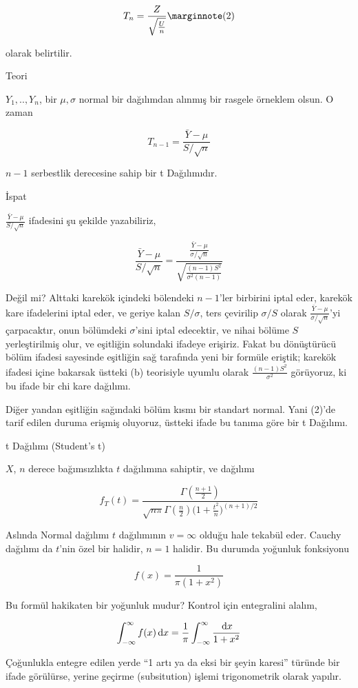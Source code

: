 \documentclass[12pt,fleqn]{article}\usepackage{../../common}
\begin{document}
$$ 
T_n = \frac{Z}{\sqrt{ \frac{U}{n}}} 
\mlabel{2} 
$$

olarak belirtilir.

Teori

$Y_1,..,Y_n$, bir $\mu,\sigma$ normal bir dağılımdan alınmış bir rasgele
örneklem olsun. O zaman 

$$ T_{n-1} = \frac{\bar{Y}-\mu}{S/\sqrt{n}}$$

$n-1$ serbestlik derecesine sahip bir t Dağılımıdır. 

İspat

$\frac{\bar{Y}-\mu}{S/\sqrt{n}}$ ifadesini şu şekilde yazabiliriz, 

$$ \frac{\bar{Y}-\mu}{S/\sqrt{n}} =
\frac{\frac{\bar{Y}-\mu}{\sigma/\sqrt{n}} }
{\sqrt{\frac{(n-1)S^2}{\sigma^2(n-1)}}}
$$

Değil mi? Alttaki karekök içindeki bölendeki $n-1$'ler birbirini iptal
eder, karekök kare ifadelerini iptal eder, ve geriye kalan $S/\sigma$, ters
çevirilip $\sigma/S$ olarak $\frac{\bar{Y}-\mu}{\sigma/\sqrt{n}}$'yi
çarpacaktır, onun bölümdeki $\sigma$'sini iptal edecektir, ve nihai bölüme
$S$ yerleştirilmiş olur, ve eşitliğin solundaki ifadeye erişiriz. Fakat bu
dönüştürücü bölüm ifadesi sayesinde eşitliğin sağ tarafında yeni bir
formüle eriştik; karekök ifadesi içine bakarsak üstteki (b) teorisiyle
uyumlu olarak $\frac{(n-1)S^2}{\sigma^2}$ görüyoruz, ki bu ifade bir chi
kare dağılımı.

Diğer yandan eşitliğin sağındaki bölüm kısmı bir standart normal. Yani
(2)'de tarif edilen duruma erişmiş oluyoruz, üstteki ifade bu tanıma göre
bir t Dağılımı. 

t Dağılımı (Student's t) 

$X$, $n$ derece bağımsızlıkta $t$ dağılımına sahiptir, ve dağılımı

$$ 
f_T(t) = 
\frac
{
\Gamma(\frac{n+1}{2})
}
{
\sqrt{n\pi}\Gamma(\frac{n}{2})
\bigg(1+\frac{t^2}{n}\bigg)^{(n+1)/2}
}
 $$

Aslında Normal dağılımı $t$ dağılımının $v = \infty$ olduğu hale tekabül
eder. Cauchy dağılımı da $t$'nin özel bir halidir, $n = 1$ halidir. Bu
durumda yoğunluk fonksiyonu

$$ f(x)  = \frac{ 1}{\pi(1+ x^2)} $$

Bu formül hakikaten bir yoğunluk mudur? Kontrol için entegralini alalım, 

$$
\int_{ -\infty}^{\infty} f(x) \,\mathrm{d} x = 
\frac{ 1}{\pi} \int_{ -\infty}^{\infty} \frac{\,\mathrm{d} x}{1 + x^2} 
$$

Çoğunlukla entegre edilen yerde  ``1 artı ya da eksi bir şeyin karesi''
türünde  bir ifade görülürse, yerine geçirme (subsitution) işlemi
trigonometrik  olarak  yapılır. 
\end{document}
